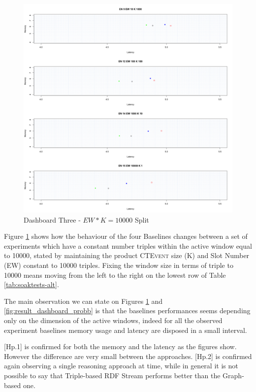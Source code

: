 \begin{figure}[h!tbp]
	\centering
	\includegraphics[width=0.90\linewidth]{images/dashboard-3-split}	
	\caption[\textsc{Analyser} Investigation Stack - Level 0 - Dashboard Three - Split Version]{Dashboard Three - $EW*K=10000$ Split} 
	\label{fig:result_dashboard_proba}
\end{figure}

Figure \ref{fig:result_dashboard_proba}  shows how the behaviour of the four Baselines changes between a set of experiments which have a constant number triples within the active window equal to 10000, stated by maintaining the product \textsc{CTEvent} size (K) and Slot Number (EW) constant to 10000 triples. Fixing the window size in terms of triple to 10000 means moving from the left to the right on the lowest row of Table \ref{tab:soaktests-alt}. 

The main observation we can state on Figures \ref{fig:result_dashboard_proba} and \ref{fig:result_dashboard_probb}  is that the baselines performances seems depending only on the dimension of the active windows, indeed for all the observed experiment  baselines memory usage and latency are disposed in a small interval.

[Hp.1] is confirmed for both the memory and the latency as the figures show. However the difference are very small between the approaches. [Hp.2] is confirmed again observing a single reasoning approach at time, while in general it is not possible to say that Triple-based RDF Stream performs better than the Graph-based one.

